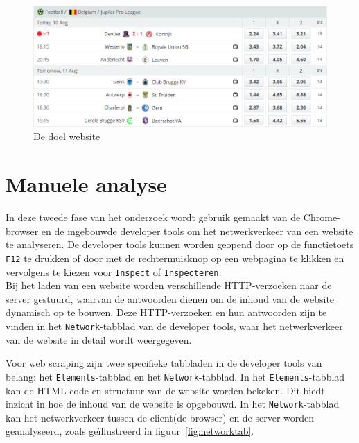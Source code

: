 \begin{figure}[h]
    \centering
    \includegraphics[width=\linewidth]{graphics/website1.png}
    \caption{De doel website}
    \label{fig:website1}
\end{figure}

\section{Manuele analyse}
\label{sec:analyse}
In deze tweede fase van het onderzoek wordt gebruik gemaakt van de Chrome-browser en de ingebouwde developer tools om het netwerkverkeer van een website te analyseren. De developer tools kunnen worden geopend door op de functietoets \texttt{F12} te drukken of door met de rechtermuisknop op een webpagina te klikken en vervolgens te kiezen voor \texttt{Inspect} of \texttt{Inspecteren}.
\\
Bij het laden van een website worden verschillende HTTP-verzoeken naar de server gestuurd, waarvan de antwoorden dienen om de inhoud van de website dynamisch op te bouwen. Deze HTTP-verzoeken en hun antwoorden zijn te vinden in het \texttt{Network}-tabblad van de developer tools, waar het netwerkverkeer van de website in detail wordt weergegeven.

Voor web scraping zijn twee specifieke tabbladen in de developer tools van belang: het \texttt{Elements}-tabblad en het \texttt{Network}-tabblad. In het \texttt{Elements}-tabblad kan de HTML-code en structuur van de website worden bekeken. Dit biedt inzicht in hoe de inhoud van de website is opgebouwd. In het \texttt{Network}-tabblad kan het netwerkverkeer tussen de client(de browser) en de server worden geanalyseerd, zoals geïllustreerd in figuur~\ref{fig:networktab}.

